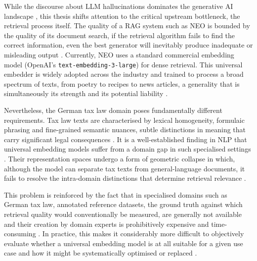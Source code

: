 While the discourse about \ac{LLM} hallucinations dominates the generative \ac{AI} landscape \cite{Ji_2023_hallucination}, this thesis shifts attention to the critical upstream bottleneck, the retrieval process itself. The quality of a \ac{RAG} system such as \ac{NEO} is bounded by the quality of its document search, if the retrieval algorithm fails to find the correct information, even the best generator will inevitably produce inadequate or misleading output \cite{barnett2024seven,reuter_towards_2025,pipitone2024legalbench}. Currently, \ac{NEO} uses a standard commercial embedding model (OpenAI's \texttt{text-embedding-3-large}) for dense retrieval. This universal embedder is widely adopted across the industry and trained to process a broad spectrum of texts, from poetry to recipes to news articles, a generality that is simultaneously its strength and its potential liability \cite{openai_embeddings_2024}.

Nevertheless, the German tax law domain poses fundamentally different requirements. Tax law texts are characterised by lexical homogeneity, formulaic phrasing and fine-grained semantic nuances, subtle distinctions in meaning that carry significant legal consequences \cite{van_opijnen_concept_2017,mattila_comparative_2013,busse_1992_recht}. It is a well-established finding in \ac{NLP} that universal embedding models suffer from a domain gap in such specialised settings \cite{gururangan_dont_2020,Lee_2019_BioBERT,chalkidis-etal-2020-legal}. Their representation spaces undergo a form of geometric collapse in which, although the model can separate tax texts from general-language documents, it fails to resolve the intra-domain distinctions that determine retrieval relevance \cite{ethayarajh-2019-contextual,wang-isola-2020-contrastive,bönisch2025finding}.

This problem is reinforced by the fact that in specialised domains such as German tax law, annotated reference datasets, the ground truth against which retrieval quality would conventionally be measured, are generally not available and their creation by domain experts is prohibitively expensive and time-consuming \cite{wrzalik_gerdalir_2021,pipitone2024legalbench,wind2026steuerllm}. In practice, this makes it considerably more difficult to objectively evaluate whether a universal embedding model is at all suitable for a given use case and how it might be systematically optimised or replaced \cite{ethayarajh_utility_2020,Sculley2018WinnersCO}. 

